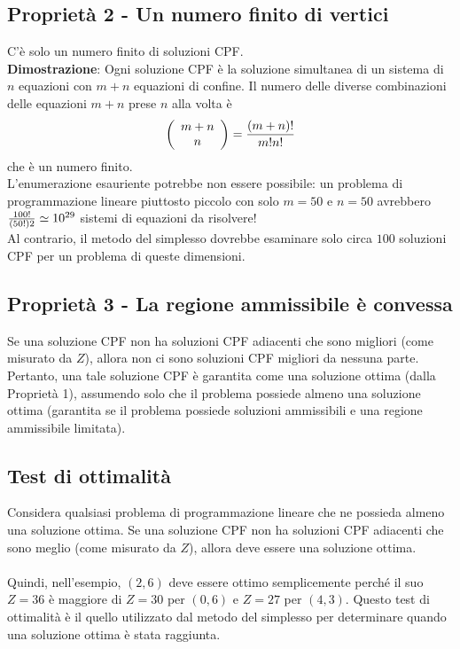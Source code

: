 \documentclass[12pt,a4paper]{article}
\begin{document}
\subsection{Proprietà 2 - Un numero finito di vertici}
C'è solo un numero finito di soluzioni CPF.\\
\textbf{Dimostrazione}: Ogni soluzione CPF è la soluzione simultanea di un sistema di $n$ equazioni con $m + n$ equazioni di confine. Il numero delle diverse combinazioni delle equazioni $m + n$ prese $n$ alla volta è
$$\left(\begin{array}{c}m+n\\n\end{array}\right)={(m+n)!\over m!n!}$$ che è un numero finito.\\
L'enumerazione esauriente potrebbe non essere possibile: un problema di programmazione lineare piuttosto piccolo con solo $m = 50$ e $n = 50$ avrebbero ${100! \over (50!)2}\simeq 10^{29}$ sistemi di equazioni da risolvere!\\
Al contrario, il metodo del simplesso dovrebbe esaminare solo circa $100$ soluzioni CPF per
un problema di queste dimensioni.

\subsection{Proprietà 3 - La regione ammissibile è convessa}
Se una soluzione CPF non ha soluzioni CPF adiacenti che sono migliori (come misurato
da $Z$), allora non ci sono soluzioni CPF migliori da nessuna parte. Pertanto, una tale soluzione CPF è garantita come una soluzione ottima (dalla Proprietà 1), assumendo
solo che il problema possiede almeno una soluzione ottima (garantita se il problema possiede soluzioni ammissibili e una regione ammissibile limitata).

\subsection{Test di ottimalità}
Considera qualsiasi problema di programmazione lineare che ne possieda almeno una soluzione ottima. Se una soluzione CPF non ha soluzioni CPF adiacenti che sono meglio (come misurato da $Z$), allora deve essere una soluzione ottima.\\
\\
Quindi, nell'esempio, $(2, 6)$ deve essere ottimo semplicemente perché il suo $Z = 36$ è
maggiore di $Z = 30$ per $(0, 6)$ e $Z = 27$ per $(4, 3)$. Questo test di ottimalità è il quello utilizzato dal metodo del simplesso per determinare quando una soluzione ottima è stata raggiunta.
\end{document}
